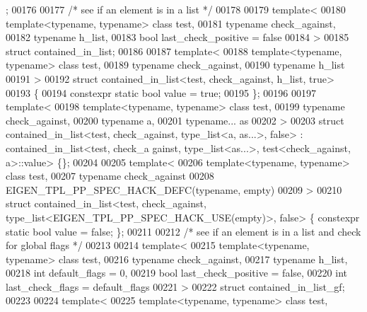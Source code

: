 \begin{DoxyCode}
      ;
00176 
00177 \textcolor{comment}{/* see if an element is in a list */}
00178 
00179 template<
00180   template<typename, typename> class test,
00181   typename check\_against,
00182   typename h\_list,
00183   \textcolor{keywordtype}{bool} last\_check\_positive = false
00184 >
00185 struct contained\_in\_list;
00186 
00187 template<
00188   template<typename, typename> class test,
00189   typename check\_against,
00190   typename h\_list
00191 >
00192 struct contained\_in\_list<test, check\_against, h\_list, true>
00193 \{
00194   constexpr \textcolor{keyword}{static} \textcolor{keywordtype}{bool} value = \textcolor{keyword}{true};
00195 \};
00196 
00197 \textcolor{keyword}{template}<
00198   \textcolor{keyword}{template}<\textcolor{keyword}{typename}, \textcolor{keyword}{typename}> \textcolor{keyword}{class }test,
00199   \textcolor{keyword}{typename} check\_against,
00200   \textcolor{keyword}{typename} a,
00201   \textcolor{keyword}{typename}... as
00202 >
00203 \textcolor{keyword}{struct }contained\_in\_list<test, check\_against, type\_list<a, as...>, false> : contained\_in\_list<test, check\_a
      gainst, type\_list<as...>, test<check\_against, a>::value> \{\};
00204 
00205 \textcolor{keyword}{template}<
00206   \textcolor{keyword}{template}<\textcolor{keyword}{typename}, \textcolor{keyword}{typename}> \textcolor{keyword}{class }test,
00207   \textcolor{keyword}{typename} check\_against
00208   EIGEN\_TPL\_PP\_SPEC\_HACK\_DEFC(\textcolor{keyword}{typename}, empty)
00209 >
00210 \textcolor{keyword}{struct }contained\_in\_list<test, check\_against, type\_list<EIGEN\_TPL\_PP\_SPEC\_HACK\_USE(empty)>, false> \{ 
      constexpr \textcolor{keyword}{static} \textcolor{keywordtype}{bool} value = \textcolor{keyword}{false}; \};
00211 
00212 \textcolor{comment}{/* see if an element is in a list and check for global flags */}
00213 
00214 \textcolor{keyword}{template}<
00215   \textcolor{keyword}{template}<\textcolor{keyword}{typename}, \textcolor{keyword}{typename}> \textcolor{keyword}{class }test,
00216   \textcolor{keyword}{typename} check\_against,
00217   \textcolor{keyword}{typename} h\_list,
00218   \textcolor{keywordtype}{int} default\_flags = 0,
00219   \textcolor{keywordtype}{bool} last\_check\_positive = \textcolor{keyword}{false},
00220   \textcolor{keywordtype}{int} last\_check\_flags = default\_flags
00221 >
00222 \textcolor{keyword}{struct }contained\_in\_list\_gf;
00223 
00224 \textcolor{keyword}{template}<
00225   \textcolor{keyword}{template}<\textcolor{keyword}{typename}, \textcolor{keyword}{typename}> \textcolor{keyword}{class }test,

\end{DoxyCode}
